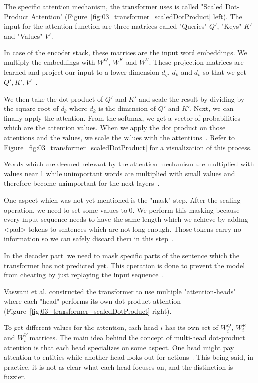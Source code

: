 The specific attention mechanism, the transformer uses is called "Scaled Dot-Product Attention" {(Figure~\ref{fig:03_transformer_scaledDotProduct} left)}. The input for the attention function are three matrices called "Queries" $Q'$, "Keys" $K'$ and "Values" $V'$.

In case of the encoder stack, these matrices are the input word embeddings. We multiply the embeddings with $W^Q$, $W^K$ and $W^V$. These projection matrices are learned and project our input to a lower dimension $d_q$, $d_k$ and $d_v$ so that we get $Q', K', V'$~\cite{Vaswani2017d}.
\bigskip

We then take the dot-product of $Q'$ and $K'$ and scale the result by dividing by the square root of $d_k$ where $d_k$ is the dimension of $Q'$ and $K'$. Next, we can finally apply the attention. From the softmax, we get a vector of probabilities which are the attention values. When we apply the dot product on those attentions and the values, we scale the values with the attentions~\cite{Vaswani2017d}. Refer to Figure~\ref{fig:03_transformer_scaledDotProduct} for a visualization of this process.
\medskip

Words which are deemed relevant by the attention mechanism are multiplied with values near 1 while unimportant words are multiplied with small values and therefore become unimportant for the next layers~\cite{Vaswani2017d}.
\medskip

One aspect which was not yet mentioned is the "mask"-step. After the scaling operation, we need to set some values to 0. We perform this masking because every input sequence needs to have the same length which we achieve by adding <pad> tokens to sentences which are not long enough. Those tokens carry no information so we can safely discard them in this step~\cite{Vaswani2017d}. 

In the decoder part, we need to mask specific parts of the sentence which the transformer has not predicted yet. This operation is done to prevent the model from cheating by just replaying the input sequence~\cite{Vaswani2017d}.
\medskip

Vaswani et al. constructed the transformer to use multiple "attention-heads" where each "head" performs its own dot-product attention {(Figure~\ref{fig:03_transformer_scaledDotProduct} right)}. 

To get different values for the attention, each head $i$ has its own set of $W_i^Q$, $W_i^K$ and $W_i^V$ matrices. The main idea behind the concept of multi-head dot-product attention is that each head specializes on some aspect. One head might pay attention to entities while another head looks out for actions~\cite{Vaswani2017d}. This being said, in practice, it is not as clear what each head focuses on, and the distinction is fuzzier.

